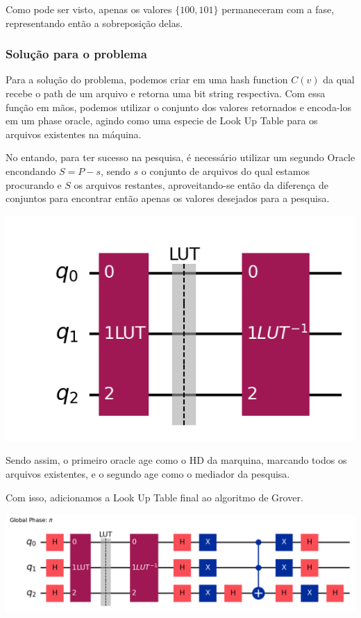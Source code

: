 \documentclass{article}
\begin{document}
Como pode ser visto, apenas os valores $\{100, 101\}$ permaneceram com a fase, representando então a sobreposição delas.


\subsubsection{Solução para o problema}

Para a solução do problema, podemos criar em uma hash function $C(v)$ da qual recebe o path de um arquivo e retorna uma bit string respectiva. Com essa função em mãos, podemos utilizar o conjunto dos valores retornados e encoda-los em um phase oracle, agindo como uma especie de Look Up Table para os arquivos existentes na máquina.

No entando, para ter sucesso na pesquisa, é necessário utilizar um segundo Oracle encondando $S = P-s$, sendo $s$ o conjunto de arquivos do qual estamos procurando e $S$ os arquivos restantes, aproveitando-se então da diferença de conjuntos para encontrar então apenas os valores desejados para a pesquisa.


\begin{center}
	\includegraphics[scale=0.6]{sets-difference-look-up-table-oracle.png}
	\label{fig:luts}
\end{center}

Sendo assim, o primeiro oracle age como o HD da marquina, marcando todos os arquivos existentes, e o segundo age como o mediador da pesquisa.

Com isso, adicionamos a Look Up Table final ao algoritmo de Grover.

\begin{center}
	\includegraphics[scale=0.5]{file_explorer.png}
	\label{fig:file-explorer}
\end{center}
\end{document}
